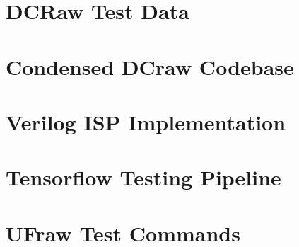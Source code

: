 \documentclass{report}
\begin{document}
\section{DCRaw Test Data} \label{dcrawdata}

\section{Condensed DCraw Codebase}

\section{Verilog ISP Implementation}

\section{Tensorflow Testing Pipeline} \label{pipelinecode}

\section{UFraw Test Commands} \label{ufrawcommands}
\end{document}
